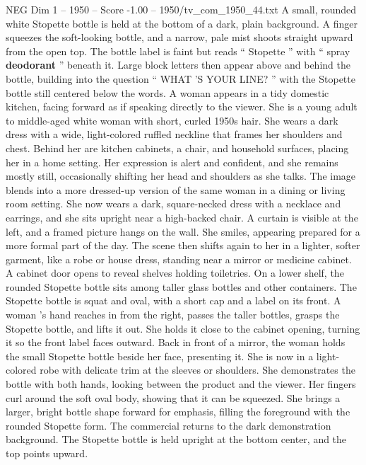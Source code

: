 \begin{textsample}{NEG Dim 1 – 1950 – Score -1.00 – 1950/tv\_com\_1950\_44.txt}  \label{ex:f1_neg_020}
A small, rounded white Stopette bottle is held at the bottom of a dark, plain background.
A finger squeezes the soft-looking bottle, and a narrow, pale mist shoots straight upward from the open top.
The bottle label is faint but reads “ Stopette ” with “ spray \textbf{deodorant} ” beneath it.
Large block letters then appear above and behind the bottle, building into the question “ WHAT ’S YOUR LINE? ” with the Stopette bottle still centered below the words.
A woman appears in a tidy domestic kitchen, facing forward as if speaking directly to the viewer.
She is a young adult to middle-aged white woman with short, curled 1950s hair.
She wears a dark dress with a wide, light-colored ruffled neckline that frames her shoulders and chest.
Behind her are kitchen cabinets, a chair, and household surfaces, placing her in a home setting.
Her expression is alert and confident, and she remains mostly still, occasionally shifting her head and shoulders as she talks.
The image blends into a more dressed-up version of the same woman in a dining or living room setting.
She now wears a dark, square-necked dress with a necklace and earrings, and she sits upright near a high-backed chair.
A curtain is visible at the left, and a framed picture hangs on the wall.
She smiles, appearing prepared for a more formal part of the day.
The scene then shifts again to her in a lighter, softer garment, like a robe or house dress, standing near a mirror or medicine cabinet.
A cabinet door opens to reveal shelves holding toiletries.
On a lower shelf, the rounded Stopette bottle sits among taller glass bottles and other containers.
The Stopette bottle is squat and oval, with a short cap and a label on its front.
A woman ’s hand reaches in from the right, passes the taller bottles, grasps the Stopette bottle, and lifts it out.
She holds it close to the cabinet opening, turning it so the front label faces outward.
Back in front of a mirror, the woman holds the small Stopette bottle beside her face, presenting it.
She is now in a light-colored robe with delicate trim at the sleeves or shoulders.
She demonstrates the bottle with both hands, looking between the product and the viewer.
Her fingers curl around the soft oval body, showing that it can be squeezed.
She brings a larger, bright bottle shape forward for emphasis, filling the foreground with the rounded Stopette form.
The commercial returns to the dark demonstration background.
The Stopette bottle is held upright at the bottom center, and the top points upward.

\end{textsample}
